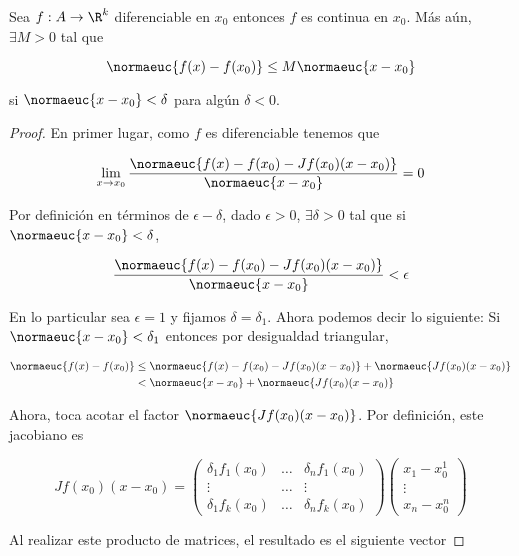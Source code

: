 \begin{teo}
    Sea $f: A \rightarrow \R^k$ diferenciable en $x_0$ entonces $f$ es continua en $x_0$. Más aún, $\exists M > 0$ tal que
    
    \[
    \normaeuc{f(x) - f(x_0)} \leq M \normaeuc{x - x_0}
    \]
    
    \noindent si $\normaeuc{x - x_0} < \delta$ para algún $\delta < 0$.
\end{teo}

\begin{proof}
    En primer lugar, como $f$ es diferenciable tenemos que
    
    \[
    \lim_{x \to x_0} \frac{\normaeuc{f(x) - f(x_0) - Jf(x_0)(x - x_0)}}{\normaeuc{x - x_0}} = 0
    \]
    
    Por definición en términos de $\epsilon - \delta$, dado $\epsilon > 0$, $\exists \delta > 0$ tal que si $\normaeuc{x-x_0} < \delta$,
    
    \[
    \frac{\normaeuc{f(x) - f(x_0) - Jf(x_0)(x - x_0)}}{\normaeuc{x - x_0}} < \epsilon
    \]
    
    En lo particular sea $\epsilon = 1$ y fijamos $\delta = \delta_1$. Ahora podemos decir lo siguiente: Si $\normaeuc{x - x_0} < \delta_1$ entonces por desigualdad triangular,
    
    \begin{align*}
        \normaeuc{f(x) - f(x_0)} &\leq \normaeuc{f(x) - f(x_0) - Jf(x_0)(x-x_0)} + \normaeuc{Jf(x_0)(x-x_0)}\\
            & < \normaeuc{x - x_0} + \normaeuc{Jf(x_0)(x-x_0)}
    \end{align*}
    
    Ahora, toca acotar el factor $\normaeuc{Jf(x_0)(x-x_0)}$. Por definición, este jacobiano es
    
    \[
    Jf(x_0)(x-x_0) =
    \begin{pmatrix}
        \delta_1 f_1 (x_0) & \dots & \delta_n f_1 (x_0) \\
        \vdots             & \dots & \vdots             \\
        \delta_1 f_k (x_0) & \dots & \delta_n f_k (x_0)
    \end{pmatrix}
    \begin{pmatrix}
        x_1-x_0^1 \\
        \vdots    \\
        x_n-x_0^n
    \end{pmatrix}
    \]
    
    Al realizar este producto de matrices, el resultado es el siguiente vector
    

\end{proof}

